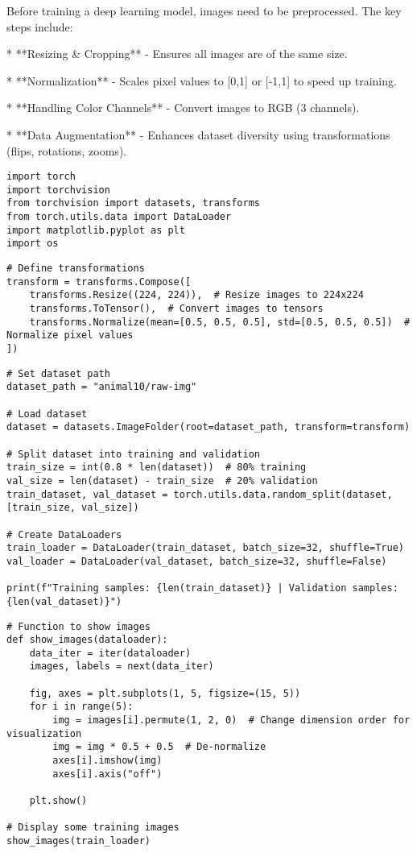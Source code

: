 Before training a deep learning model, images need to be preprocessed. The key steps include:

*  **Resizing & Cropping** - Ensures all images are of the same size.

*  **Normalization** - Scales pixel values to [0,1] or [-1,1] to speed up training.

*  **Handling Color Channels** - Convert images to RGB (3 channels).

*  **Data Augmentation** - Enhances dataset diversity using transformations (flips, rotations, zooms).

\begin{verbatim}
import torch
import torchvision
from torchvision import datasets, transforms
from torch.utils.data import DataLoader
import matplotlib.pyplot as plt
import os

\end{verbatim}

\begin{verbatim}
# Define transformations
transform = transforms.Compose([
    transforms.Resize((224, 224)),  # Resize images to 224x224
    transforms.ToTensor(),  # Convert images to tensors
    transforms.Normalize(mean=[0.5, 0.5, 0.5], std=[0.5, 0.5, 0.5])  # Normalize pixel values
])
\end{verbatim}

\begin{verbatim}
# Set dataset path
dataset_path = "animal10/raw-img"

# Load dataset
dataset = datasets.ImageFolder(root=dataset_path, transform=transform)

# Split dataset into training and validation
train_size = int(0.8 * len(dataset))  # 80% training
val_size = len(dataset) - train_size  # 20% validation
train_dataset, val_dataset = torch.utils.data.random_split(dataset, [train_size, val_size])

# Create DataLoaders
train_loader = DataLoader(train_dataset, batch_size=32, shuffle=True)
val_loader = DataLoader(val_dataset, batch_size=32, shuffle=False)

print(f"Training samples: {len(train_dataset)} | Validation samples: {len(val_dataset)}")

\end{verbatim}

\begin{verbatim}
# Function to show images
def show_images(dataloader):
    data_iter = iter(dataloader)
    images, labels = next(data_iter)

    fig, axes = plt.subplots(1, 5, figsize=(15, 5))
    for i in range(5):
        img = images[i].permute(1, 2, 0)  # Change dimension order for visualization
        img = img * 0.5 + 0.5  # De-normalize
        axes[i].imshow(img)
        axes[i].axis("off")

    plt.show()

# Display some training images
show_images(train_loader)
\end{verbatim}

